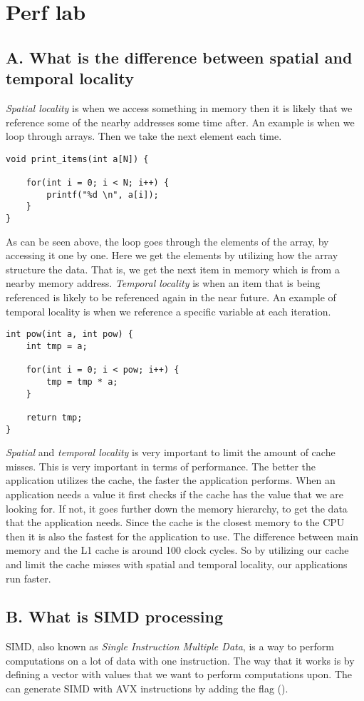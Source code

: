\section{Perf lab}

\subsection{A. What is the difference between spatial and temporal locality}
\textit{Spatial locality} is when we access something in memory then it is likely that we reference some of the nearby addresses some time after. An example is
when we loop through arrays. Then we take the next element each time.
\begin{lstlisting}
void print_items(int a[N]) {

    for(int i = 0; i < N; i++) {
        printf("%d \n", a[i]);
    }
}
\end{lstlisting}
As can be seen above, the loop goes through the elements of the array, by accessing it one by one. Here we get the elements
by utilizing how the array structure the data. That is, we get the next item in memory which is from a nearby memory address.
\textit{Temporal locality} is when an item that is being referenced is likely to be 
referenced again in the near future. An example of temporal locality is when we reference a specific variable
at each iteration.
\begin{lstlisting}
int pow(int a, int pow) {
    int tmp = a;

    for(int i = 0; i < pow; i++) {
        tmp = tmp * a;
    }

    return tmp;
}
\end{lstlisting}
\textit{Spatial} and \textit{temporal locality} is very important to limit the amount of cache misses. This is very important in terms of performance.
The better the application utilizes the cache, the faster the application performs. When an application needs a value it first checks if the cache has
the value that we are looking for. If not, it goes further down the memory hierarchy, to get the data that the application needs. 
Since the cache is the closest memory to the CPU then it is also the fastest for the application to use. The difference between main memory and the L1 cache is around 100 clock cycles.
So by utilizing our cache and limit the cache misses with spatial and temporal locality, our applications run faster.

\subsection{B. What is SIMD processing}
SIMD, also known as \textit{Single Instruction Multiple Data}, is a way to perform computations on a lot of data with one instruction. The way that it works is by defining a vector with values that we want to perform computations upon. The  can generate SIMD with AVX instructions by adding the flag (\cite{simd-avx}).

